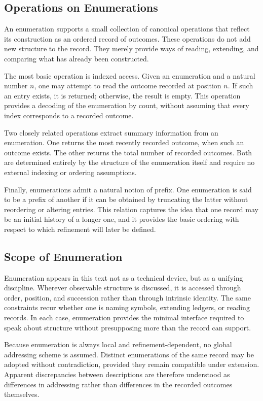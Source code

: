 \subsection{Operations on Enumerations}

An enumeration supports a small collection of canonical operations that reflect
its construction as an ordered record of outcomes. These operations do not add
new structure to the record. They merely provide ways of reading, extending, and
comparing what has already been constructed.

The most basic operation is indexed access. Given an enumeration and a natural
number $n$, one may attempt to read the outcome recorded at position $n$. If such
an entry exists, it is returned; otherwise, the result is empty. This operation
provides a decoding of the enumeration by count, without assuming that every
index corresponds to a recorded outcome.

Two closely related operations extract summary information from an enumeration.
One returns the most recently recorded outcome, when such an outcome exists. The
other returns the total number of recorded outcomes. Both are determined entirely
by the structure of the enumeration itself and require no external indexing or
ordering assumptions.

Finally, enumerations admit a natural notion of prefix. One enumeration is said
to be a prefix of another if it can be obtained by truncating the latter without
reordering or altering entries. This relation captures the idea that one record
may be an initial history of a longer one, and it provides the basic ordering
with respect to which refinement will later be defined.

\subsection{Scope of Enumeration}

Enumeration appears in this text not as a technical device, but as a unifying
discipline. Wherever observable structure is discussed, it is accessed through
order, position, and succession rather than through intrinsic identity. The same
constraints recur whether one is naming symbols, extending ledgers, or reading
records. In each case, enumeration provides the minimal interface required to
speak about structure without presupposing more than the record can support.

Because enumeration is always local and refinement-dependent, no global
addressing scheme is assumed. Distinct enumerations of the same record may be
adopted without contradiction, provided they remain compatible under extension.
Apparent discrepancies between descriptions are therefore understood as
differences in addressing rather than differences in the recorded outcomes
themselves.


